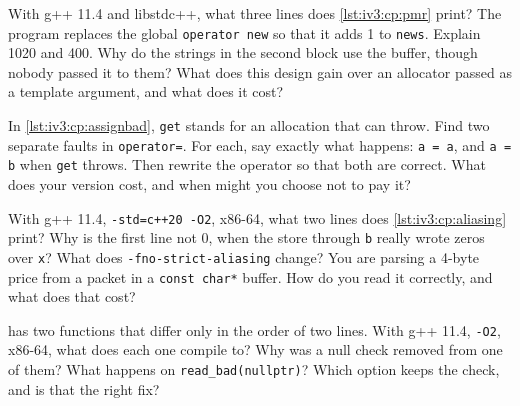 \begin{question}\label{iq:iv3:cpp:45}
With g++ 11.4 and libstdc++, what three lines does \cref{lst:iv3:cp:pmr} print? The program replaces the global \texttt{operator new} so that it adds 1 to \texttt{news}. Explain 1020 and 400. Why do the strings in the second block use the buffer, though nobody passed it to them? What does this design gain over an allocator passed as a template argument, and what does it cost?
\label{lst:iv3:cp:pmr}
\end{question}

\begin{question}\label{iq:iv3:cpp:46}
In \cref{lst:iv3:cp:assignbad}, \texttt{get} stands for an allocation that can throw. Find two separate faults in \texttt{operator=}. For each, say exactly what happens: \texttt{a = a}, and \texttt{a = b} when \texttt{get} throws. Then rewrite the operator so that both are correct. What does your version cost, and when might you choose not to pay it?
\label{lst:iv3:cp:assignbad}
\end{question}

\begin{question}\label{iq:iv3:cpp:47}
With g++ 11.4, \texttt{-std=c++20 -O2}, x86-64, what two lines does \cref{lst:iv3:cp:aliasing} print? Why is the first line not 0, when the store through \texttt{b} really wrote zeros over \texttt{x}? What does \texttt{-fno-strict-aliasing} change? You are parsing a 4-byte price from a packet in a \texttt{const char*} buffer. How do you read it correctly, and what does that cost?
\label{lst:iv3:cp:aliasing}
\end{question}

\begin{question}\label{iq:iv3:cpp:48}
 has two functions that differ only in the order of two lines. With g++ 11.4, \texttt{-O2}, x86-64, what does each one compile to? Why was a null check removed from one of them? What happens on \texttt{read\_bad(nullptr)}? Which option keeps the check, and is that the right fix?
\label{lst:iv3:cp:nullcheck}
\end{question}

